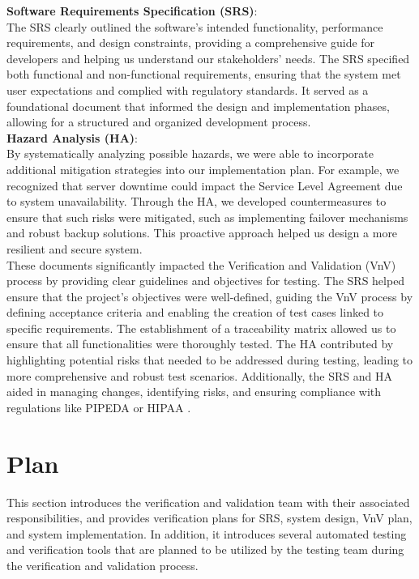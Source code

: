 \documentclass[12pt, titlepage]{article}
\begin{document}
\noindent \textbf{Software Requirements Specification (SRS)}:\\

\noindent The SRS clearly outlined the software's intended functionality, performance requirements, and design constraints, providing a comprehensive guide for developers and helping us understand our stakeholders' needs. The SRS specified both functional and non-functional requirements, ensuring that the system met user expectations and complied with regulatory standards. It served as a foundational document that informed the design and implementation phases, allowing for a structured and organized development process.\\

\noindent \textbf{Hazard Analysis (HA)}:\\

\noindent  By systematically analyzing possible hazards, we were able to incorporate additional mitigation strategies into our implementation plan. For example, we recognized that server downtime could impact the Service Level Agreement due to system unavailability. Through the HA, we developed countermeasures to ensure that such risks were mitigated, such as implementing failover mechanisms and robust backup solutions. This proactive approach helped us design a more resilient and secure system.\\


\noindent These documents significantly impacted the Verification and Validation (VnV) process by providing clear guidelines and objectives for testing. The SRS helped ensure that the project's objectives were well-defined, guiding the VnV process by defining acceptance criteria and enabling the creation of test cases linked to specific requirements. The establishment of a traceability matrix allowed us to ensure that all functionalities were thoroughly tested. The HA contributed by highlighting potential risks that needed to be addressed during testing, leading to more comprehensive and robust test scenarios. Additionally, the SRS and HA aided in managing changes, identifying risks, and ensuring compliance with regulations like PIPEDA or HIPAA \citep{HIPAA}.

\section{Plan}

This section introduces the verification and validation team with their associated
 responsibilities, and provides verification plans for SRS, system design, VnV plan,
 and system implementation. In addition, it introduces several automated testing
 and verification tools that are planned to be utilized by the testing team during the
 verification and validation process.
\end{document}
